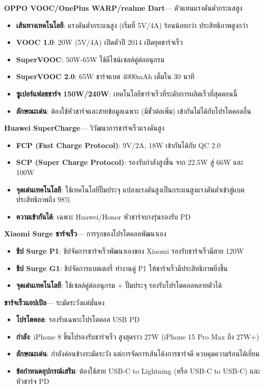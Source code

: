 \textbf{OPPO VOOC/OnePlus WARP/realme Dart}— ตัวแทนแรงดันต่ำกระแสสูง

\begin{itemize}
  \item \textbf{เส้นทางเทคโนโลยี}: แรงดันต่ำกระแนสูง (เริ่มที่ 5V/4A) ร้อนน้อยกว่า ประสิทธิภาพสูงกว่า
  \item \textbf{VOOC 1.0}: 20W (5V/4A) เปิดตัวปี 2014 เปิดยุคชาร์จเร็ว
  \item \textbf{SuperVOOC}: 50W-65W ใช้ดีไซน์เซลล์คู่ต่ออนุกรม
  \item \textbf{SuperVOOC 2.0}: 65W ชาร์จแบต 4000mAh เต็มใน 30 นาที
  \item \textbf{ซูเปอร์แฟลชชาร์จ 150W/240W}: เทคโนโลยีชาร์จเร็วที่ระดับการผลิตเร็วที่สุดตอนนี้
  \item \textbf{ลักษณะเด่น}: ต้องใช้หัวชาร์จและสายข้อมูลเฉพาะ (มีขั้วต่อเพิ่ม) เข้ากันไม่ได้กับโปรโตคอลอื่น
\end{itemize}

\textbf{Huawei SuperCharge}— วิวัฒนาการชาร์จเร็วแรงดันสูง

\begin{itemize}
  \item \textbf{FCP (Fast Charge Protocol)}: 9V/2A, 18W เข้ากันได้กับ QC 2.0
  \item \textbf{SCP (Super Charge Protocol)}: รองรับกำลังสูงขึ้น จาก 22.5W สู่ 66W และ 100W
  \item \textbf{จุดเด่นเทคโนโลยี}: ใช้เทคโนโลยีปั๊มประจุ แปลงแรงดันสูงเป็นกระแนสูงแรงดันต่ำเข้าสู่แบต ประสิทธิภาพถึง 98\%
  \item \textbf{ความเข้ากันได้}: เฉพาะ Huawei/Honor หัวชาร์จบางรุ่นรองรับ PD
\end{itemize}

\textbf{Xiaomi Surge ชาร์จเร็ว}— การรุกของโปรโตคอลพัฒนาเอง

\begin{itemize}
  \item \textbf{ชิป Surge P1}: ชิปจัดการชาร์จเร็วพัฒนาเองของ Xiaomi รองรับชาร์จเร็วมีสาย 120W
  \item \textbf{ชิป Surge G1}: ชิปจัดการแบตเตอรี่ ทำงานคู่ P1 ให้ชาร์จเร็วมีประสิทธิภาพยิ่งขึ้น
  \item \textbf{จุดเด่นเทคโนโลยี}: ใช้เซลล์คู่ต่ออนุกรม + ปั๊มประจุ รองรับโปรโตคอลหลายตัวได้
\end{itemize}

\textbf{ชาร์จเร็วแอปเปิล}— ระมัดระวังแต่มั่นคง

\begin{itemize}
  \item \textbf{โปรโตคอล}: รองรับเฉพาะโปรโตคอล USB PD
  \item \textbf{กำลัง}: iPhone 8 ขึ้นไปรองรับชาร์จเร็ว สูงสุดราว 27W (iPhone 15 Pro Max ถึง 27W+)
  \item \textbf{ลักษณะเด่น}: กำลังค่อนข้างระมัดระวัง แต่การจัดการเส้นโค้งการชาร์จดี ควบคุมความร้อนได้เยี่ยม
  \item \textbf{ข้อกำหนดอุปกรณ์เสริม}: ต้องใช้สาย USB-C to Lightning (หรือ USB-C to USB-C) และหัวชาร์จ PD
\end{itemize}

